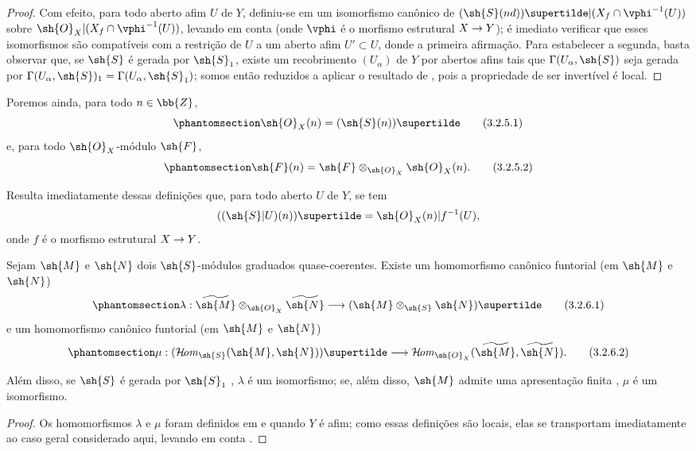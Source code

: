 \documentclass[oneside,10pt]{amsart}
\makeatletter
\newcommand{\ega@arrow}[2]{\mathchoice{#1}{#2}{#2}{#2}}
\renewcommand{\to}{\ega@arrow{\longrightarrow}{\rightarrow}}
\def\shHom{\mathcal{H}\!\mathit{om}}
\let\EGAOriginalLabel\label
\renewcommand{\label}[1]{\phantomsection\EGAOriginalLabel{#1}}
\makeatother
\begin{document}
\begin{proof}
Com efeito, para todo aberto afim $U$ de $Y$, definiu-se em  um isomorfismo canônico de $(\sh{S}(nd))\supertilde|(X_f\cap\vphi^{-1}(U))$ sobre $\sh{O}_X|(X_f\cap\vphi^{-1}(U))$, levando em conta  (onde $\vphi$ é o morfismo estrutural $X\to Y$);
é imediato verificar que esses isomorfismos são compatíveis com a restrição de $U$ a um aberto afim $U'\subset U$, donde a primeira afirmação.
Para estabelecer a segunda, basta observar que, se $\sh{S}$ é gerada por $\sh{S}_1$, existe um recobrimento $(U_\alpha)$ de $Y$ por abertos afins tais que $\Gamma(U_\alpha,\sh{S})$ seja gerada por $\Gamma(U_\alpha,\sh{S})_1=\Gamma(U_\alpha,\sh{S}_1)$;
somos então reduzidos a aplicar o resultado de , pois a propriedade de ser invertível é local.
\end{proof}

Poremos ainda, para todo $n\in\bb{Z}$,
\[
\label{II.3.2.5.1}
  \sh{O}_X(n)=(\sh{S}(n))\supertilde
\tag{3.2.5.1}
\]
e, para todo $\sh{O}_X$-módulo $\sh{F}$,
\[
\label{II.3.2.5.2}
  \sh{F}(n)=\sh{F}\otimes_{\sh{O}_X}\sh{O}_X(n).
\tag{3.2.5.2}
\]

Resulta imediatamente dessas definições que, para todo aberto $U$ de $Y$, se tem
\[
  ((\sh{S}|U)(n))\supertilde=\sh{O}_X(n)|f^{-1}(U),
\]
onde $f$ é o morfismo estrutural $X\to Y$.

\begin{proposition}[3.2.6]
\label{II.3.2.6}
Sejam $\sh{M}$ e $\sh{N}$ dois $\sh{S}$-módulos graduados quase-coerentes.
Existe um homomorfismo canônico funtorial (em $\sh{M}$ e $\sh{N}$)
\[
\label{II.3.2.6.1}
  \lambda:\widetilde{\sh{M}}\otimes_{\sh{O}_X}\widetilde{\sh{N}}\to(\sh{M}\otimes_{\sh{S}}\sh{N})\supertilde
\tag{3.2.6.1}
\]
e um homomorfismo canônico funtorial (em $\sh{M}$ e $\sh{N}$)
\[
\label{II.3.2.6.2}
  \mu:(\shHom_{\sh{S}}(\sh{M},\sh{N}))\supertilde\to\shHom_{\sh{O}_X}(\widetilde{\sh{M}},\widetilde{\sh{N}}).
\tag{3.2.6.2}
\]

Além disso, se $\sh{S}$ é gerada por $\sh{S}_1$ , $\lambda$ é um isomorfismo;
se, além disso, $\sh{M}$ admite uma apresentação finita , $\mu$ é um isomorfismo.
\end{proposition}

\begin{proof}
Os homomorfismos $\lambda$ e $\mu$ foram definidos em  e  quando $Y$ é afim;
como essas definições são locais, elas se transportam imediatamente ao caso geral considerado aqui, levando em conta .
\end{proof}
\end{document}
